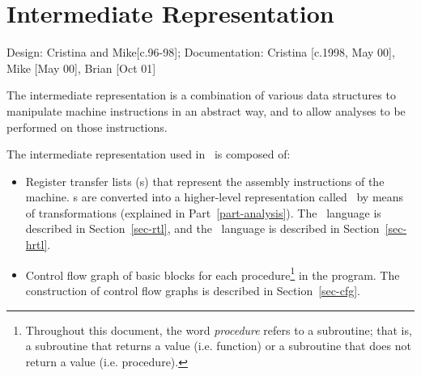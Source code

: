
\chapter{Intermediate Representation}
\label{ch-ir}

{\small
\begin{flushright}
Design: Cristina and Mike[c.96-98]; 
Documentation: Cristina [c.1998, May 00], Mike [May 00], Brian [Oct 01]
\end{flushright} 
}

The intermediate representation is a combination of various
data structures to manipulate machine instructions in an
abstract way, and to allow analyses to be performed on those
instructions. 

The intermediate representation used in \uqbt\ is composed of:
\begin{itemize}
\item Register transfer lists (\rtl s) that represent the assembly
instructions of the machine.  \rtl s are converted into a higher-level 
representation called \hrtl\ by means of transformations 
(explained in Part~\ref{part-analysis}).  
The \rtl\ language is described in Section~\ref{sec-rtl}, and
the \hrtl\ language is described in Section~\ref{sec-hrtl}.

\item Control flow graph of basic blocks for each procedure\footnote{
Throughout this document, the word {\it procedure} refers to a
subroutine; that is, a subroutine that returns a value (i.e. function) 
or a subroutine that does not return a value (i.e. procedure).
} in the program.
The construction of control flow graphs is described in Section~\ref{sec-cfg}.
\end{itemize}

